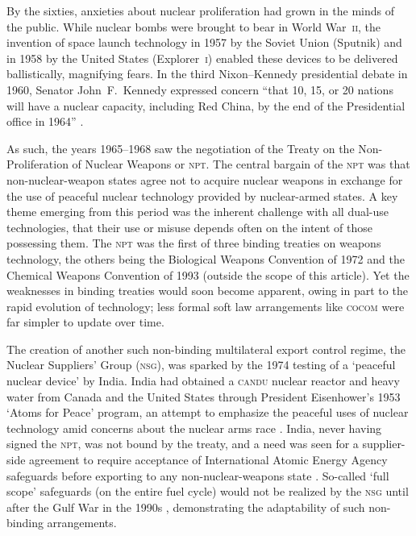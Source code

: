 \documentclass[preprint,twocolumn,5p]{elsarticle}
\begin{document}
By the sixties, anxieties about nuclear proliferation had grown in the minds of the public. While nuclear bombs were brought to bear in World War~\textsc{ii}, the invention of space launch technology in 1957 by the Soviet Union (Sputnik) and in 1958 by the United States (Explorer~\textsc{i}) enabled these devices to be delivered ballistically, magnifying fears. In the third Nixon--Kennedy presidential debate in 1960, Senator John~F.~Kennedy expressed concern ``that 10, 15, or 20 nations will have a nuclear capacity, including Red China, by the end of the Presidential office in 1964'' \citep{NixonKennedy3rd1960}.

As such, the years 1965--1968 saw the negotiation of the Treaty on the Non-Proliferation of Nuclear Weapons or \textsc{npt}. The central bargain of the \textsc{npt} was that non-nuclear-weapon states agree not to acquire nuclear weapons in exchange for the use of peaceful nuclear technology provided by nuclear-armed states. A key theme emerging from this period was the inherent challenge with all dual-use technologies, that their use or misuse depends often on the intent of those possessing them. The \textsc{npt} was the first of three binding treaties on weapons technology, the others being the Biological Weapons Convention of 1972 and the Chemical Weapons Convention of 1993 \citep{Beck2019} (outside the scope of this article). Yet the weaknesses in binding treaties would soon become apparent, owing in part to the rapid evolution of technology; less formal soft law arrangements like \textsc{cocom} were far simpler to update over time.


The creation of another such non-binding multilateral export control regime, the Nuclear Suppliers' Group (\textsc{nsg}), was sparked by the 1974 testing of a `peaceful nuclear device' by India. India had obtained a \textsc{candu} nuclear reactor and heavy water from Canada and the United States through President Eisenhower's 1953 `Atoms for Peace' program, an attempt to emphasize the peaceful uses of nuclear technology amid concerns about the nuclear arms race \citep{Walker2001}. India, never having signed the \textsc{npt}, was not bound by the treaty, and a need was seen for a supplier-side agreement to require acceptance of International Atomic Energy Agency safeguards before exporting to any non-nuclear-weapons state \citep{Burr2014}. So-called `full scope' safeguards (on the entire fuel cycle) would not be realized by the \textsc{nsg} until after the Gulf War in the 1990s \citep{Anthony2007}, demonstrating the adaptability of such non-binding arrangements.
\end{document}
